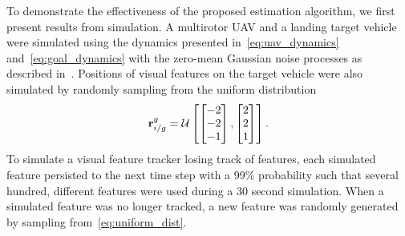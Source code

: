 
To demonstrate the effectiveness of the proposed estimation algorithm, we first
present results from simulation.
A multirotor UAV and a landing target vehicle were simulated using the dynamics presented
in~\eqref{eq:uav_dynamics} and~\eqref{eq:goal_dynamics} with the zero-mean
Gaussian noise processes as described
in~.
Positions of visual features on the target vehicle
were also simulated by randomly sampling from the uniform distribution
\begin{equation}
  \boldsymbol{\mathrm{r}}_{i/g}^g = \mathcal{U}
  \left[ \begin{bmatrix} -2 \\ -2 \\ -1 \end{bmatrix},
  \begin{bmatrix} 2 \\ 2 \\ 1 \end{bmatrix} \right].
  \label{eq:uniform_dist}
\end{equation}
To simulate a visual feature tracker losing track of features, each simulated feature
persisted to the next time step with a 99\% probability such that several
hundred, different features were used during a 30 second simulation. When a
simulated feature was no longer tracked, a new feature was randomly generated by
sampling from~\eqref{eq:uniform_dist}.

